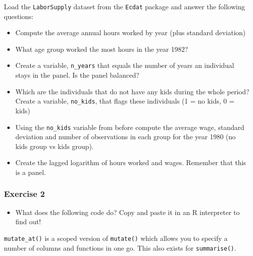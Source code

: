 \documentclass[]{gitbook}
\newenvironment{Shaded}{\begin{snugshade}}{\end{snugshade}}
\newcommand{\KeywordTok}[1]{\textcolor[rgb]{0.13,0.29,0.53}{\textbf{#1}}}
\newcommand{\NormalTok}[1]{#1}
\newcommand{\OperatorTok}[1]{\textcolor[rgb]{0.81,0.36,0.00}{\textbf{#1}}}
\newcommand{\StringTok}[1]{\textcolor[rgb]{0.31,0.60,0.02}{#1}}
\providecommand{\tightlist}{%
  \setlength{\itemsep}{0pt}\setlength{\parskip}{0pt}}
\begin{document}
Load the \texttt{LaborSupply} dataset from the \texttt{Ecdat} package and answer the following questions:

\begin{itemize}
\tightlist
\item
  Compute the average annual hours worked by year (plus standard deviation)
\item
  What age group worked the most hours in the year 1982?
\item
  Create a variable, \texttt{n\_years} that equals the number of years an individual stays in the panel. Is the panel balanced?
\item
  Which are the individuals that do not have any kids during the whole period? Create a variable, \texttt{no\_kids}, that flags these individuals (1 = no kids, 0 = kids)
\item
  Using the \texttt{no\_kids} variable from before compute the average wage, standard deviation and number of observations in each group for the year 1980 (no kids group vs kids group).
\item
  Create the lagged logarithm of hours worked and wages. Remember that this is a panel.
\end{itemize}

\hypertarget{exercise-2-1}{%
\subsubsection*{Exercise 2}\label{exercise-2-1}}

\begin{itemize}
\tightlist
\item
  What does the following code do? Copy and paste it in an R interpreter to find out!
\end{itemize}

\begin{Shaded}
\end{Shaded}

\texttt{mutate\_at()} is a scoped version of \texttt{mutate()} which allows you to specify a number of columns and
functions in one go. This also exists for \texttt{summarise()}.
\end{document}
